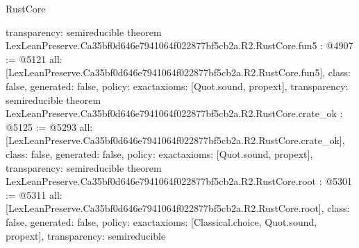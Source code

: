 \begin{lexlean}{RustCore}
\begin{coremodule}
{  transparency: semireducible
}
theorem LexLeanPreserve.Ca35bf0d646e7941064f022877bf5cb2a.R2.RustCore.fun5 : @4907 := @5121 {
  all: [LexLeanPreserve.Ca35bf0d646e7941064f022877bf5cb2a.R2.RustCore.fun5],
  class: false,
  generated: false,
  policy: exact{axioms: [Quot.sound, propext]},
  transparency: semireducible
}
theorem LexLeanPreserve.Ca35bf0d646e7941064f022877bf5cb2a.R2.RustCore.crate_ok : @5125 := @5293 {
  all: [LexLeanPreserve.Ca35bf0d646e7941064f022877bf5cb2a.R2.RustCore.crate_ok],
  class: false,
  generated: false,
  policy: exact{axioms: [Quot.sound, propext]},
  transparency: semireducible
}
theorem LexLeanPreserve.Ca35bf0d646e7941064f022877bf5cb2a.R2.RustCore.root : @5301 := @5311 {
  all: [LexLeanPreserve.Ca35bf0d646e7941064f022877bf5cb2a.R2.RustCore.root],
  class: false,
  generated: false,
  policy: exact{axioms: [Classical.choice, Quot.sound, propext]},
  transparency: semireducible
}


\end{coremodule}
\end{lexlean}
